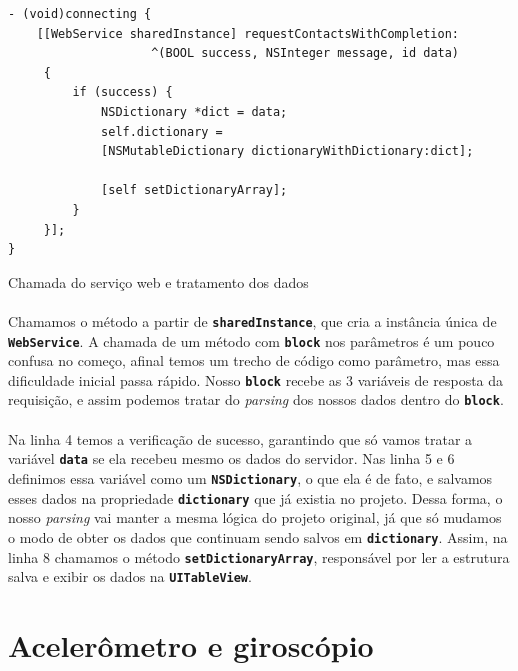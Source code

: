 \documentclass[a4paper,12pt,brazil,doubleside]{book}
\begin{document}
\begin{singlespace}
\begin{listing}[H]
\begin{verbatim}
- (void)connecting {
    [[WebService sharedInstance] requestContactsWithCompletion:
                    ^(BOOL success, NSInteger message, id data)
     {
         if (success) {
             NSDictionary *dict = data;
             self.dictionary = 
             [NSMutableDictionary dictionaryWithDictionary:dict];
             
             [self setDictionaryArray];
         }
     }];
}
\end{verbatim}
\caption{Chamada do serviço web e tratamento dos dados}
\end{listing}

\paragraph{}Chamamos o método a partir de \texttt{\textbf{sharedInstance}}, que cria a instância única de\\ \texttt{\textbf{WebService}}. A chamada de um método com \texttt{\textbf{block}} nos parâmetros é um pouco confusa no começo, afinal temos um trecho de código como parâmetro, mas essa dificuldade inicial passa rápido. Nosso \texttt{\textbf{block}} recebe as 3 variáveis de resposta da requisição, e assim podemos tratar  do \emph{parsing} dos nossos dados dentro do \texttt{\textbf{block}}.
\paragraph{}Na linha 4 temos a verificação de sucesso, garantindo que só vamos tratar a variável \texttt{\textbf{data}} se ela recebeu mesmo os dados do servidor. Nas linha 5 e 6 definimos essa variável como um \texttt{\textbf{NSDictionary}}, o que ela é de fato, e salvamos esses dados na propriedade \texttt{\textbf{dictionary}} que já existia no projeto. Dessa forma, o nosso \emph{parsing} vai manter a mesma lógica do projeto original, já que só mudamos o modo de obter os dados que continuam sendo salvos em \texttt{\textbf{dictionary}}. Assim, na linha 8 chamamos o método \texttt{\textbf{setDictionaryArray}}, responsável por ler a estrutura salva e exibir os dados na \texttt{\textbf{UITableView}}.

\bigskip

\section{Acelerômetro e giroscópio}


\end{singlespace}
\end{document}
